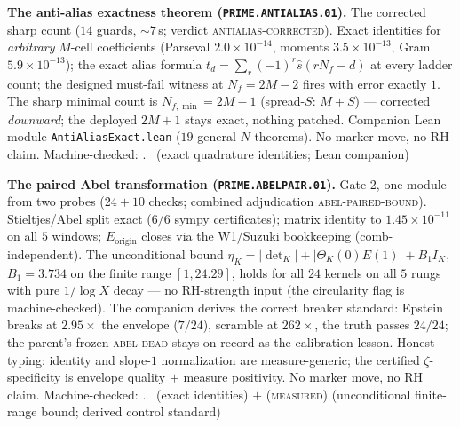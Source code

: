 \documentclass[11pt,a4paper]{article}
\theoremstyle{definition}
\begin{document}
\par\smallskip\noindent\textbf{The anti-alias exactness theorem
(\texttt{PRIME.ANTIALIAS.01}).}
The corrected sharp count ($14$ guards, ${\sim}7$\,s; verdict
\textsc{antialias-corrected}).  Exact identities for
\emph{arbitrary} $M$-cell coefficients (Parseval
$2.0\times10^{-14}$, moments $3.5\times10^{-13}$, Gram
$5.9\times10^{-13}$); the exact alias formula
$t_d=\sum_r(-1)^r\hat s(rN_f-d)$ at every ladder count; the
designed must-fail witness at $N_f=2M{-}2$ fires with error exactly
$1$.  The sharp minimal count is $N_{f,\min}=2M{-}1$ (spread-$S$:
$M{+}S$) --- corrected \emph{downward}; the deployed $2M{+}1$ stays
exact, nothing patched.  Companion Lean module
\texttt{AntiAliasExact.lean} ($19$ general-$N$ theorems).  No
marker move, no RH claim.
Machine-checked: .
\mE\ (exact quadrature identities; Lean companion)
\par\smallskip

\par\smallskip\noindent\textbf{The paired Abel transformation
(\texttt{PRIME.ABELPAIR.01}).}
Gate 2, one module from two probes ($24{+}10$ checks; combined
adjudication \textsc{abel-paired-bound}).  Stieltjes/Abel split
exact ($6/6$ sympy certificates); matrix identity to
$1.45\times10^{-11}$ on all $5$ windows; $E_{\mathrm{origin}}$
closes via the W1/Suzuki bookkeeping (comb-independent).  The
unconditional bound
$\eta_K=|\det_K|+|\Theta_K(0)E(1)|+B_1I_K$, $B_1=3.734$ on the
finite range $[1,24.29]$, holds for all $24$ kernels on all $5$
rungs with pure $1/\log X$ decay --- no RH-strength input (the
circularity flag is machine-checked).  The companion derives the
correct breaker standard: Epstein breaks at $2.95\times$ the
envelope ($7/24$), scramble at $262\times$, the truth passes
$24/24$; the parent's frozen \textsc{abel-dead} stays on record as
the calibration lesson.  Honest typing: identity and slope-$1$
normalization are measure-generic; the certified
$\zeta$-specificity is envelope quality $+$ measure positivity.  No
marker move, no RH claim.
Machine-checked: .
\mE\ (exact identities) $+$ (\textsc{measured}) (unconditional
finite-range bound; derived control standard)
\par\smallskip
\end{document}
